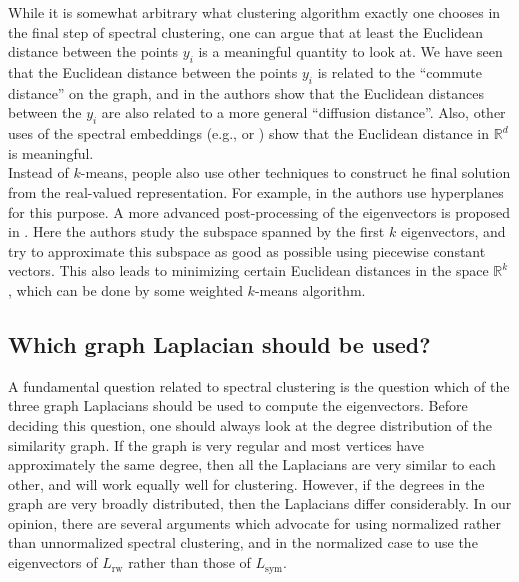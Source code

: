 \documentclass{article}
\newcommand{\RR}{\mathbb{R}}
\newcommand{\R}{\RR}
\newcommand{\Lsym}{L_{\text{sym}}}
\newcommand{\Lrw}{L_{\text{rw}}}
\begin{document}
While it is somewhat arbitrary what clustering algorithm exactly one
chooses in the final step of spectral clustering, one can argue that
at least the Euclidean distance between the points $y_i$ is a
meaningful quantity to look at. We have seen that the Euclidean
distance between the points $y_i$ is related to the ``commute
distance'' on the graph, and in  the authors show
that the Euclidean distances between the $y_i$ are also related to a
more general ``diffusion distance''. Also, other uses of the spectral
embeddings (e.g.,  or ) show
that the Euclidean distance in $\R^d$ is meaningful.\\


Instead of $k$-means, people also use other techniques to construct he
final solution from the real-valued representation. For example, in
 the authors use hyperplanes for this purpose. A more
advanced post-processing of the eigenvectors is proposed in
. Here the authors study the subspace spanned by
the first $k$ eigenvectors, and try to approximate this subspace as
good as possible using piecewise constant vectors.  This also leads to
minimizing certain Euclidean distances in the space $\R^k$, which can
be done by some weighted $k$-means algorithm.\\

%
%
%



%
\subsection{Which graph Laplacian should be used? } \label{ssec-whichone}
%


A fundamental question related to spectral clustering is the question
which of the three graph Laplacians should be used to compute the
eigenvectors. Before deciding this
question, one should always look at the degree distribution of the similarity
graph. If the graph is very regular and most vertices have
approximately the same degree, then all the Laplacians are very
similar to each other, and will work equally well for clustering.
However, if the degrees in the graph are very broadly distributed, then the
Laplacians differ considerably. In our opinion, there are several
arguments which advocate for using normalized rather than unnormalized
spectral clustering, and in the normalized case to use
the eigenvectors of  $\Lrw$ rather than those of $\Lsym$. \\
\end{document}

